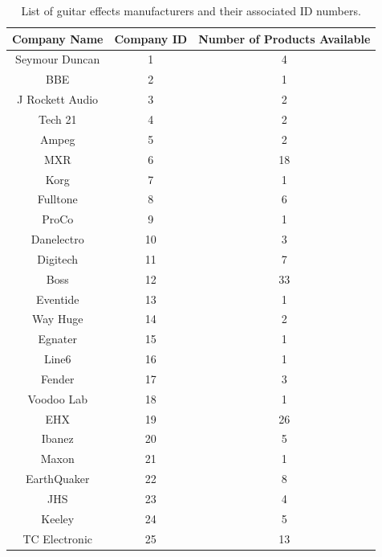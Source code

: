 		\begin{table}
		\begin{center}
		\begin{tabular}{ |c c c| }
		\hline
		 Company Name & Company ID & Number of Products Available \\ 
		 \hline
		Seymour Duncan    &  1        &  4     \\
	    BBE               &  2        &  1     \\
	    J Rockett Audio   &  3        &  2     \\
	    Tech 21           &  4        &  2     \\
	    Ampeg             &  5        &  2     \\
	    MXR               &  6        & 18     \\
	    Korg              &  7        &  1     \\
	    Fulltone          &  8        &  6     \\
	    ProCo             &  9        &  1     \\
	    Danelectro        & 10        &  3     \\
	    Digitech          & 11        &  7     \\
	    Boss              & 12        & 33     \\
	    Eventide          & 13        &  1     \\
	    Way Huge          & 14        &  2     \\
	    Egnater           & 15        &  1     \\
	    Line6             & 16        &  1     \\
	    Fender            & 17        &  3     \\
	    Voodoo Lab        & 18        &  1     \\
	    EHX               & 19        & 26     \\
	    Ibanez            & 20        &  5	   \\    
	    Maxon             & 21        &  1     \\
	    EarthQuaker       & 22        &  8     \\
	    JHS               & 23        &  4     \\
	    Keeley            & 24        &  5     \\
	    TC Electronic     & 25        & 13     \\
	   	\hline
		\end{tabular}
		\caption{List of guitar effects manufacturers and their associated ID numbers.}
		\label{tab:pedal_companies}
		\end{center}
		\end{table}


